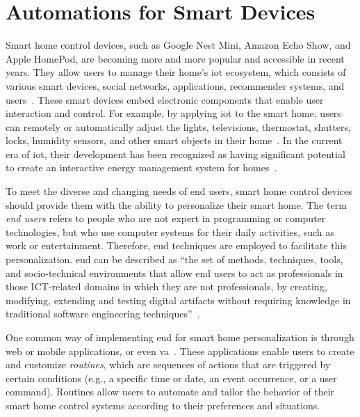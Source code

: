 \section{Automations for Smart Devices}

Smart home control devices, such as Google Nest Mini, Amazon Echo Show, and Apple HomePod, are becoming more and more popular and accessible in recent years. They allow users to manage their home's \acrshort{iot} ecosystem, which consists of various smart devices, social networks, applications, recommender systems, and users~\parencite{barricelliDesigningEndUserDevelopment2015}. These smart devices embed electronic components that enable user interaction and control. For example, by applying \acrshort{iot} to the smart home, users can remotely or automatically adjust the lights, televisions, thermostat, shutters, locks, humidity sensors, and other smart objects in their home~\parencite{kortuemSmartObjectsBuilding2010,wuRespectChangeUser2017}. In the current era of \acrshort{iot}, their development has been recognized as having significant potential to create an interactive energy management system for homes~\parencite{graditiInnovativeControlLogics2015}.

To meet the diverse and changing needs of end users, smart home control devices should provide them with the ability to personalize their smart home. The term \textit{end users} refers to people who are not expert in programming or computer technologies, but who use computer systems for their daily activities, such as work or entertainment. Therefore, \acrfull{eud} techniques are employed to facilitate this personalization. \acrshort{eud} can be described as “the set of methods, techniques, tools, and socio-technical environments that allow end users to act as professionals in those ICT-related domains in which they are not professionals, by creating, modifying, extending and testing digital artifacts without requiring knowledge in traditional software engineering techniques”~\parencite{barricelliEnduserDevelopmentEnduser2019}.

One common way of implementing \acrshort{eud} for smart home personalization is through web or mobile applications, or even \acrfull{va}~\parencite{barricelliVirtualAssistantsPersonalizing2021,arditoSmartObjectsSmart2018}. These applications enable users to create and customize \textit{routines}, which are sequences of actions that are triggered by certain conditions (e.g., a specific time or date, an event occurrence, or a user command). Routines allow users to automate and tailor the behavior of their smart home control systems according to their preferences and situations.

